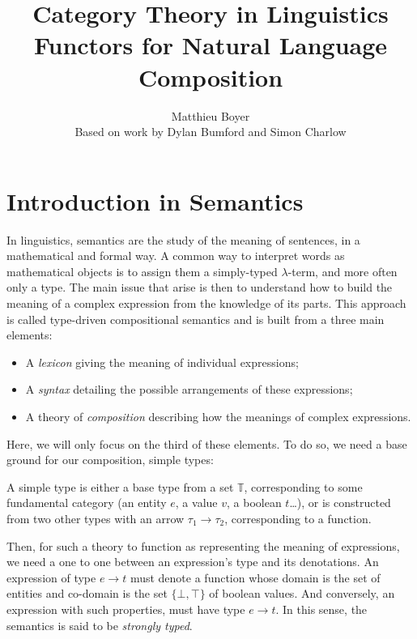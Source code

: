\documentclass[math, info]{cours}
\title{Category Theory in Linguistics \\ {\small Functors for Natural Language Composition}}
\author{Matthieu Boyer\\ {\small Based on work by Dylan Bumford and Simon Charlow}}
\begin{document}
\bettertitle
\section*{Introduction in Semantics}
In linguistics, semantics are the study of the meaning of sentences, in a mathematical and formal way.
A common way to interpret words as mathematical objects is to assign them a simply-typed $\lambda$-term, and more often only a type.
The main issue that arise is then to understand how to build the meaning of a complex expression from the knowledge of its parts.
This approach is called type-driven compositional semantics and is built from a three main elements:
\begin{itemize}
	\item A \emph{lexicon} giving the meaning of individual expressions;
	\item A \emph{syntax} detailing the possible arrangements of these expressions;
	\item A theory of \emph{composition} describing how the meanings of complex expressions.
\end{itemize}
Here, we will only focus on the third of these elements. To do so, we need a base ground for our composition, simple types:
\begin{definition}
	A simple type is either a base type from a set $\mathbb{T}$, corresponding to some fundamental category (an entity $e$, a value $v$, a boolean $t$\ldots), or is constructed from two other types with an arrow $\tau_{1} \to \tau_{2}$, corresponding to a function.
	\label{def:simpletype}
\end{definition}
Then, for such a theory to function as representing the meaning of expressions, we need a one to one between an expression's type and its denotations.
An expression of type $e \to t$ must denote a function whose domain is the set of entities and co-domain is the set $\{\bot, \top\}$ of boolean values.
And conversely, an expression with such properties, must have type $e \to t$.
In this sense, the semantics is said to be \emph{strongly typed}.
\end{document}
